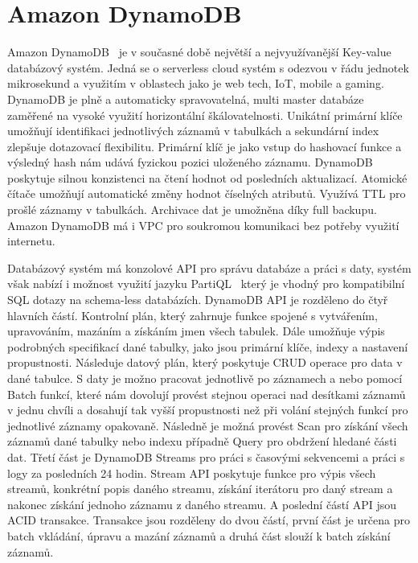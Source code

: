 \documentclass[czech,master,dept460,male,csharp,cpdeclaration]{diploma}
\begin{document}
	\section{Amazon DynamoDB}
	
	Amazon DynamoDB~\cite{dynamodb} je v současné době největší a nejvyužívanější Key-value databázový systém. Jedná se o serverless cloud systém s odezvou v řádu jednotek mikrosekund a využitím v oblastech jako je web tech, IoT, mobile a gaming. DynamoDB je plně a automaticky spravovatelná, multi master databáze zaměřené na vysoké využití horizontální škálovatelnosti. Unikátní primární klíče umožňují identifikaci jednotlivých záznamů v tabulkách a sekundární index zlepšuje dotazovací flexibilitu. Primární klíč je jako vstup do hashovací funkce a výsledný hash nám udává fyzickou pozici uloženého záznamu. DynamoDB poskytuje silnou konzistenci na čtení hodnot od posledních aktualizací. Atomické čítače umožňují automatické změny hodnot číselných atributů. Využívá TTL pro prošlé záznamy v tabulkách. Archivace dat je umožněna díky full backupu. Amazon DynamoDB má i VPC pro soukromou komunikaci bez potřeby využití internetu.
	
	Databázový systém má konzolové API pro správu databáze a práci s daty, systém však nabízí i možnost využití jazyku PartiQL~\cite{partiql} který je vhodný pro kompatibilní SQL dotazy na schema-less databázích. DynamoDB API je rozděleno do čtyř hlavních částí. Kontrolní plán, který zahrnuje funkce spojené s vytvářením, upravováním, mazáním a získáním jmen všech tabulek. Dále umožňuje výpis podrobných specifikací dané tabulky, jako jsou primární klíče, indexy a nastavení propustnosti. Následuje datový plán, který poskytuje CRUD operace pro data v dané tabulce. S daty je možno pracovat jednotlivě po záznamech a nebo pomocí Batch funkcí, které nám dovolují provést stejnou operaci nad desítkami záznamů v jednu chvíli a dosahují tak vyšší propustnosti než při volání stejných funkcí pro jednotlivé záznamy opakovaně. Následně je možná provést Scan pro získání všech záznamů dané tabulky nebo indexu případně Query pro obdržení hledané části dat. Třetí část je DynamoDB Streams pro práci s časovými sekvencemi a práci s logy za posledních 24 hodin. Stream API poskytuje funkce pro výpis všech streamů, konkrétní popis daného streamu, získání iterátoru pro daný stream a nakonec získání jednoho záznamu z daného streamu. A poslední částí API jsou ACID transakce. Transakce jsou rozděleny do dvou částí, první část je určena pro batch vkládání, úpravu a mazání záznamů a druhá část slouží k batch získání záznamů.
		
\end{document}
